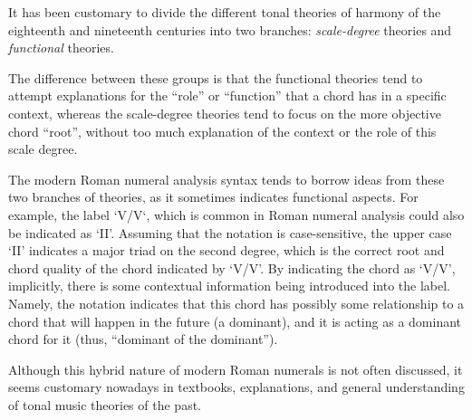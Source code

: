 It has been customary to divide the different tonal theories of harmony of the eighteenth and nineteenth centuries into two branches: \emph{scale-degree} theories and \emph{functional} theories.

The difference between these groups is that the functional theories tend to attempt explanations for the ``role'' or ``function'' that a chord has in a specific context, whereas the scale-degree theories tend to focus on the more objective chord ``root'', without too much explanation of the context or the role of this scale degree.

The modern Roman numeral analysis syntax tends to borrow ideas from these two branches of theories, as it sometimes indicates functional aspects.
For example, the label `V/V`, which is common in Roman numeral analysis could also be indicated as `II'.
Assuming that the notation is case-sensitive, the upper case `II' indicates a major triad on the second degree, which is the correct root and chord quality of the chord indicated by `V/V'.
By indicating the chord as `V/V', implicitly, there is some contextual information being introduced into the label.
Namely, the notation indicates that this chord has possibly some relationship to a chord that will happen in the future (a dominant), and it is acting as a dominant chord for it (thus, ``dominant of the dominant'').

Although this hybrid nature of modern Roman numerals is not often discussed, it seems customary nowadays in textbooks, explanations, and general understanding of tonal music theories of the past.




